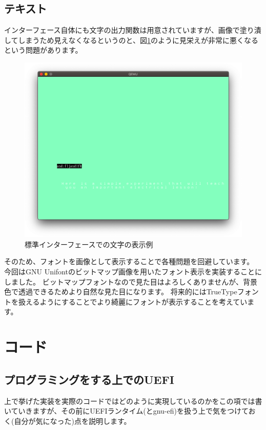 \documentclass[10pt, b5paper, openany]{ltjsbook}
\begin{document}
\section{テキスト}
インターフェース自体にも文字の出力関数は用意されていますが、画像で塗り潰してしまうため見えなくなるというのと、図\ref{fig:defaultfont}のように見栄えが非常に悪くなるという問題があります。
\begin{figure}[H]
    \centering
    \includegraphics[scale=0.3]{pic/defaultfont.png}
    \caption{標準インターフェースでの文字の表示例}
    \label{fig:defaultfont}
\end{figure}
そのため、フォントを画像として表示することで各種問題を回避しています。
今回はGNU Unifontのビットマップ画像を用いたフォント表示を実装することにしました。
ビットマップフォントなので見た目はよろしくありませんが、背景色で透過できるためより自然な見た目になります。
将来的にはTrueTypeフォントを扱えるようにすることでより綺麗にフォントが表示することを考えています。

\chapter{コード}
\section{プログラミングをする上でのUEFI}
上で挙げた実装を実際のコードではどのように実現しているのかをこの項では書いていきますが、その前にUEFIランタイム(とgnu-efi)を扱う上で気をつけておく(自分が気になった)点を説明します。
\end{document}
